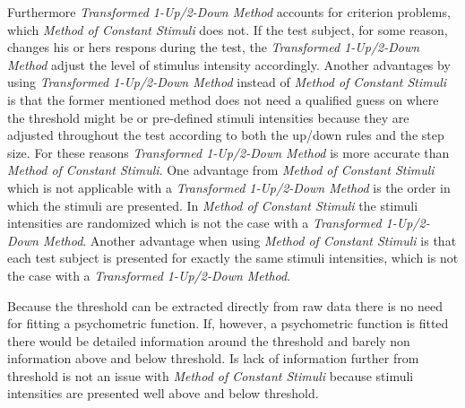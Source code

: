 Furthermore \textit{Transformed 1-Up/2-Down Method} accounts for criterion problems, which \textit{Method of Constant Stimuli} does not. If the test subject, for some reason, changes his or hers respons during the test, the \textit{Transformed 1-Up/2-Down Method} adjust the level of stimulus intensity accordingly. Another advantages by using \textit{Transformed 1-Up/2-Down Method} instead of \textit{Method of Constant Stimuli} is that the former mentioned method does not need a qualified guess on where the threshold might be or pre-defined stimuli intensities because they are adjusted throughout the test according to both the up/down rules and the step size. For these reasons \textit{Transformed 1-Up/2-Down Method} is more accurate than \textit{Method of Constant Stimuli}.\blankline
%
One advantage from \textit{Method of Constant Stimuli} which is not applicable with a \textit{Transformed 1-Up/2-Down Method} is the order in which the stimuli are presented. In \textit{Method of Constant Stimuli} the stimuli intensities are randomized which is not the case with a \textit{Transformed 1-Up/2-Down Method}. Another advantage when using \textit{Method of Constant Stimuli} is that each test subject is presented for exactly the same stimuli intensities, which is not the case with a \textit{Transformed 1-Up/2-Down Method}. 

Because the threshold can be extracted directly from raw data there is no need for fitting a psychometric function. If, however, a psychometric function is fitted there would be detailed information around the threshold and barely non information above and below threshold. Is lack of information further from threshold is not an issue with \textit{Method of Constant Stimuli} because stimuli intensities are presented well above and below threshold.      


